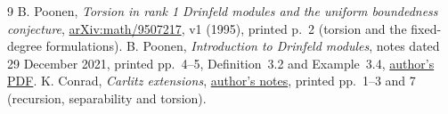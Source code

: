 \documentclass[10pt,a4paper]{article}
\begin{document}
\begin{thebibliography}{9}
 B. Poonen, \emph{Torsion in rank 1 Drinfeld modules and
the uniform boundedness conjecture},
\href{https://arxiv.org/abs/math/9507217}{arXiv:math/9507217}, v1 (1995),
printed p.~2 (torsion and the fixed-degree formulations).
 B. Poonen, \emph{Introduction to Drinfeld modules},
notes dated 29 December 2021, printed pp.~4--5, Definition~3.2 and
Example~3.4, \href{https://math.mit.edu/~poonen/papers/drinfeld.pdf}{author's PDF}.
 K. Conrad, \emph{Carlitz extensions},
\href{https://kconrad.math.uconn.edu/blurbs/gradnumthy/carlitz.pdf}{author's notes},
printed pp.~1--3 and 7 (recursion, separability and torsion).
\end{thebibliography}
\end{document}

